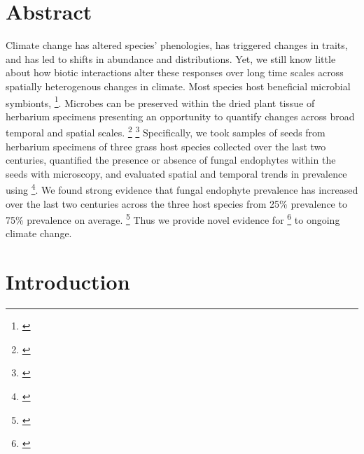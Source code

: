 \documentclass[11pt]{article}
\newcommand{\tom}[2]{{\color{red}{#1}}\footnote{\textit{\color{red}{#2}}}}
\begin{document}
	\section*{Abstract}
Climate change has altered species’ phenologies, has triggered changes in traits, and has led to shifts in abundance and distributions. 
Yet, we still know little about how biotic interactions alter these responses over long time scales across spatially heterogenous changes in climate. 
Most species host beneficial microbial symbionts, \tom{which may provide resilience to changes in the environment, but at the same time increasing stress may lead these symbioses to breakdown}{A little confusing as written. Might be better to present as alernative hypotheses}. 
Microbes can be preserved within the dried plant tissue of herbarium specimens presenting an opportunity to quantify changes across broad temporal and spatial scales. 
\tom{Epichloë fungal endophytes are seed-transmitted symbionts of cool-season grasses which can provide drought tolerance to their hosts. }{I would cut this sentence and incorporate need to know info in other sentences.}
\tom{ We ask how endophyte prevalence has responded to climate change.}{Could be sharpened.} 
 Specifically, we took samples of seeds from herbarium specimens of three grass host species collected over the last two centuries, quantified the presence or absence of fungal endophytes within the seeds with microscopy, and evaluated spatial and temporal trends in prevalence using \tom{spatial modeling}{Vague}.
 We found strong evidence that fungal endophyte prevalence has increased over the last two centuries across the three host species from 25\% prevalence to 75\% prevalence on average.
\tom{We also found that observed changed in annual  and seasonal climate drivers were associated with temporal trends in endophyte prevalence. 
In particular, changes in prevalence within each species corresponded to climate drivers during its peak growing season. }{Could be combined into one sentence.}
Thus we provide novel evidence for \tom{adaptive biotic responses}{Not sure what you mean by this.} to ongoing climate change.


	
	\newpage{}
	
	\section*{Introduction}
	
\end{document}
